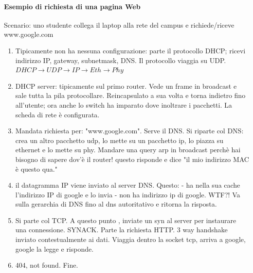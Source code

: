 \paragraph{Esempio di richiesta di una pagina Web}
Scenario: uno studente collega il laptop alla rete del campus e richiede/riceve www.google.com
\begin{enumerate}
	\item Tipicamente non ha nessuna configurazione: parte il protocollo DHCP; ricevi indirizzo IP, gateway, subnetmask, DNS. Il protocollo viaggia su UDP.\\
	$ DHCP \rightarrow UDP \rightarrow IP \rightarrow Eth \rightarrow Phy $
	
	\item DHCP server: tipicamente sul primo router. Vede un frame in broadcast e sale tutta la pila protocollare.
	Reincapsulato a sua volta e torna indietro fino all'utente; ora anche lo switch ha imparato dove inoltrare i pacchetti. La scheda di rete è configurata.
	
	\item Mandata richiesta per: "www.google.com". Serve il DNS.
	Si riparte col DNS: crea un altro pacchetto udp, lo mette su un pacchetto ip, lo piazza su ethernet e lo mette su phy.
	Mandare una query arp in broadcast perchè hai bisogno di sapere dov'è il router! questo risponde e dice "il mio indirizzo MAC è questo qua."
	
	\item il datagramma IP viene inviato al server DNS. Questo:
	- ha nella sua cache l'indirizzo IP di google e lo invia
	- non ha indirizzo ip di google. WTF?! Va sulla gerarchia di DNS fino al dns autoritativo e ritorna la risposta.
	
	\item Si parte col TCP.	A questo punto , inviate un syn al server per instaurare una connessione. SYNACK. Parte la richiesta HTTP. 3 way handshake inviato contestualmente ai dati.
	Viaggia dentro la socket tcp, arriva a google, google la legge e risponde. 
	
	\item 404, not found.
	Fine.
\end{enumerate}